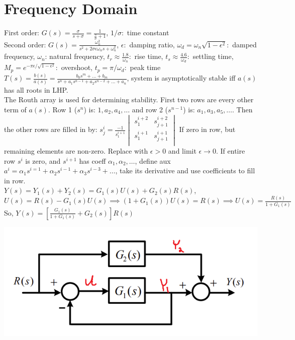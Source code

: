 \documentclass[11pt]{article}
\begin{document}
\section{Frequency Domain}
First order: $G(s) = \frac{\sigma}{s + \sigma} = \frac{1}{\frac{s}{\sigma}+1}$, $1/\sigma:$ time constant\\
Second order: $G(s) = \frac{\omega_n^2}{s^2 + 2 \sigma \epsilon \omega_n s + \omega_n ^2}$, $\epsilon:$ damping ratio, $\omega_d =\omega_n\sqrt{1 - \epsilon^2}:$ damped frequency, $\omega_n$: natural frequency,
$t_r \approx \frac{1.8}{\omega_n}:$ rise time, $t_s \approx \frac{4.6}{\omega_d}:$ settling time, $M_p = e^{-\pi \epsilon / \sqrt{1 - \epsilon^2}}:$ overshoot, $t_p = \pi/\omega_d:$ peak time\\

$T(s) = \frac{b(s)}{a(s)} = \frac{b_0 s^m + \dots + b_m}{s^n + a_1s^{n-1} + a_2 s^{n-2} + \dots + a_n}$, system is asymptotically stable iff $a(s)$ has all roots in LHP.\\
The Routh array is used for determining stability.
First two rows are every other term of $a(s)$.
Row 1 ($s^n$) is: $1, a_2, a_4, \dots$ and row 2 ($s^{n-1}$) is: $a_1, a_3, a_5, \dots$.
Then the other rows are filled in by: 
$s^i_j = \frac{-1}{s^{i+1}_1} \begin{vmatrix}
    s^{i+2}_1 & s^{i+2}_{j+1} \\
    s^{i+1}_1 & s^{i+1}_{j+1} \\
\end{vmatrix}$
If zero in row, but remaining elements are non-zero. Replace with $\epsilon > 0$ and limit $\epsilon \to 0$.
If entire row $s^i$ is zero, and $s^{i+1}$ has coeff $\alpha_1, \alpha_2, \dots$, define aux $a^i = \alpha_1 s^{i=1} + \alpha_2 s^{i-1} + \alpha_3 s^{i-3} + \dots$,
take its derivative and use coefficients to fill in row.\\


$Y(s) = Y_1(s) + Y_2(s) = G_1(s) U(s) + G_2(s)R(s)$,\\
$U(s) = R(s) - G_1(s)U(s) \implies (1 + G_1(s))U(s) = R(s) \implies U(s) = \frac{R(s)}{1 + G_1(s)}$ \\
So, $Y(s) = \left[\frac{G_1(s)}{1 + G_1(s)} + G_2(s)\right] R(s)$
\begin{center}
    \includegraphics[width=0.99 \linewidth]{transfer.png}
\end{center}
\end{document}
